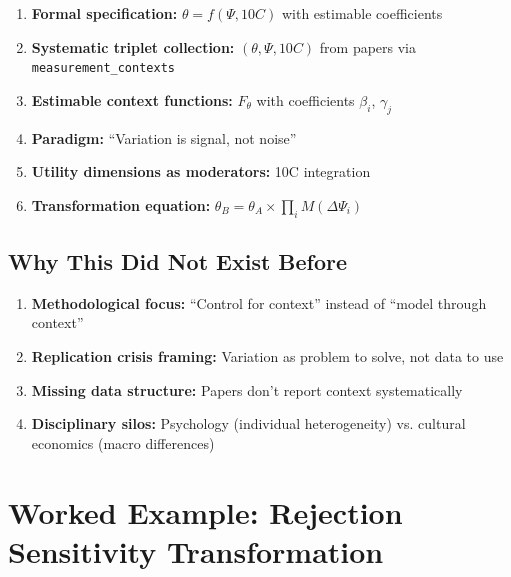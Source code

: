 \begin{tcolorbox}[colback=red!5!white, colframe=red!75!black, title=Novel Contributions]
\begin{enumerate}
    \item \textbf{Formal specification:} $\theta = f(\Psi, 10C)$ with estimable coefficients
    \item \textbf{Systematic triplet collection:} $(\theta, \Psi, 10C)$ from papers via \texttt{measurement\_contexts}
    \item \textbf{Estimable context functions:} $F_\theta$ with coefficients $\beta_i$, $\gamma_j$
    \item \textbf{Paradigm:} ``Variation is signal, not noise''
    \item \textbf{Utility dimensions as moderators:} 10C integration
    \item \textbf{Transformation equation:} $\theta_B = \theta_A \times \prod_i M(\Delta\Psi_i)$
\end{enumerate}
\end{tcolorbox}

\subsection{Why This Did Not Exist Before}

\begin{enumerate}
    \item \textbf{Methodological focus:} ``Control for context'' instead of ``model through context''
    \item \textbf{Replication crisis framing:} Variation as problem to solve, not data to use
    \item \textbf{Missing data structure:} Papers don't report context systematically
    \item \textbf{Disciplinary silos:} Psychology (individual heterogeneity) vs. cultural economics (macro differences)
\end{enumerate}



\section{Worked Example: Rejection Sensitivity Transformation}
\label{sec:worked-example}

